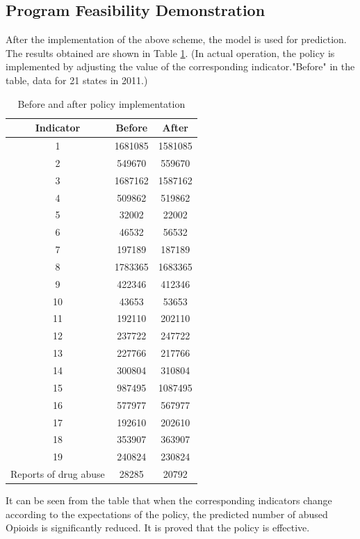 \documentclass[12pt]{mcmthesis}
\begin{document}
\subsection{Program Feasibility Demonstration}
After the implementation of the above scheme, the model is used for prediction. The results obtained are shown in Table \ref{io}. (In actual operation, the policy is implemented by adjusting the value of the corresponding indicator."Before" in the table, data for 21 states in 2011.)\par
\begin{table}
  \centering
  \caption{Before and after policy implementation}\label{io}
  \begin{tabular}{|c|c|c|}
  \hline
Indicator             & Before  & After   \\\hline
1                     & 1681085 & 1581085 \\
2                     & 549670  & 559670  \\
3                     & 1687162 & 1587162 \\
4                     & 509862  & 519862  \\
5                     & 32002   & 22002   \\
6                     & 46532   & 56532   \\
7                     & 197189  & 187189  \\
8                     & 1783365 & 1683365 \\
9                     & 422346  & 412346  \\
10                    & 43653   & 53653   \\
11                    & 192110  & 202110  \\
12                    & 237722  & 247722  \\
13                    & 227766  & 217766  \\
14                    & 300804  & 310804  \\
15                    & 987495  & 1087495 \\
16                    & 577977  & 567977  \\
17                    & 192610  & 202610  \\
18                    & 353907  & 363907  \\
19                    & 240824  & 230824  \\\hline
Reports of drug abuse & 28285   & 20792\\\hline
\end{tabular}
\end{table}
It can be seen from the table that when the corresponding indicators change according to the expectations of the policy, the predicted number of abused Opioids is significantly reduced. It is proved that the policy is effective.
\end{document}
